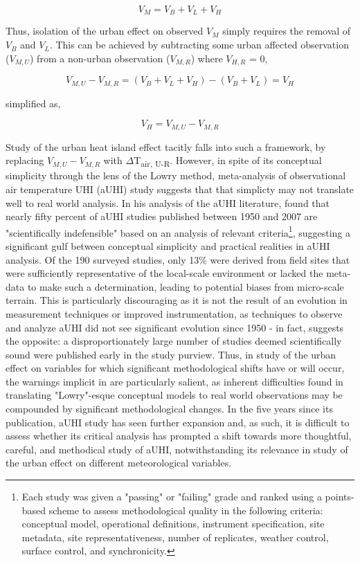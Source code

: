 \begin{bibunit}
\begin{equation}
	V_M = V_B + V_L + V_H
\end{equation}

Thus, isolation of the urban effect on observed $V_M$ simply requires the removal of $V_B$ and $V_L$. This can be achieved by subtracting some urban affected observation ($V_{M, U}$) from a non-urban observation ($V_{M, R}$) where $V_{H, R}$ = 0,

\begin{equation}
V_{M, U} - V_{M, R} = (V_B + V_L + V_H) - (V_B + V_L) = V_H
\end{equation}

\noindent simplified as,

\begin{equation}
	V_H = V_{M, U} - V_{M, R}
\end{equation}

Study of the urban heat island effect tacitly falls into such a framework, by replacing $V_{M, U} - V_{M, R}$ with $\Delta$T\textsubscript{air, U-R}. However, in spite of its conceptual simplicity through the lens of the Lowry method, meta-analysis of observational air temperature UHI (aUHI) study suggests that that simplicty may not translate well to real world analysis. In his analysis of the aUHI literature, \citet{Stewart2011} found that nearly fifty percent of aUHI studies published between 1950 and 2007 are "scientifically indefensible" based on an analysis of relevant criteria\footnote{Each study was given a "passing" or "failing" grade and ranked using a points-based scheme to assess methodological quality in the following criteria: conceptual model, operational definitions, instrument specification, site metadata, site representativeness, number of replicates, weather control, surface control, and synchronicity.}, suggesting a significant gulf between conceptual simplicity and practical realities in aUHI analysis. Of the 190 surveyed studies, only 13\% were derived from field sites that were sufficiently representative of the local-scale environment or lacked the meta-data to make such a determination, leading to potential biases from micro-scale terrain. This is particularly discouraging as it is not the result of an evolution in measurement techniques or improved instrumentation, as techniques to observe and analyze aUHI did not see significant evolution since 1950 - in fact, \citet{Stewart2011} suggests the opposite: a disproportionately large number of studies deemed scientifically sound were published early in the study purview. Thus, in study of the urban effect on variables for which significant methodological shifts have or will occur, the warnings implicit in \citet{Stewart2011} are particularly salient, as inherent difficulties found in translating "Lowry"-esque conceptual models to real world observations may be compounded by significant methodological changes. In the five years since its publication, aUHI study has seen further expansion and, as such, it is difficult to assess whether its critical analysis has prompted a shift towards more thoughtful, careful, and methodical study of aUHI, notwithstanding its relevance in study of the urban effect on different meteorological variables.


\end{bibunit}
